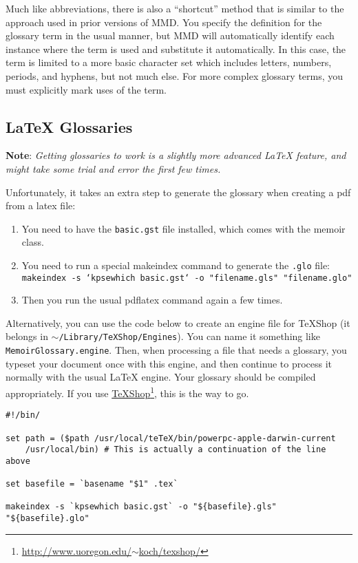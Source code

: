 Much like abbreviations, there is also a ``shortcut'' method that is similar to the approach used in prior versions of \gls{MMD}. You specify the definition for the glossary term in the usual manner, but \gls{MMD} will automatically identify each instance where the term is used and substitute it automatically. In this case, the term is limited to a more basic character set which includes letters, numbers, periods, and hyphens, but not much else. For more complex glossary terms, you must explicitly mark uses of the term.

\subsection{LaTeX Glossaries }
\label{latexglossaries}

\textbf{Note}: \emph{Getting glossaries to work is a slightly more advanced LaTeX
feature, and might take some trial and error the first few times.}

Unfortunately, it takes an extra step to generate the glossary when creating a
pdf from a latex file:

\begin{enumerate}
\item You need to have the \texttt{basic.gst} file installed, which comes with the
memoir class.

\item You need to run a special makeindex command to generate the \texttt{.glo} file:
\texttt{makeindex -s `kpsewhich basic.gst` -o "filename.gls" "filename.glo"}

\item Then you run the usual pdflatex command again a few times.

\end{enumerate}

Alternatively, you can use the code below to create an engine file for TeXShop (it belongs in \texttt{\ensuremath{\sim}\slash Library\slash TeXShop\slash Engines}). You can name it something like \texttt{MemoirGlossary.engine}. Then, when processing a file that needs a glossary, you typeset your document once with this engine, and then continue to process it normally with the usual LaTeX engine. Your glossary should be compiled appropriately. If you use \href{http://www.uoregon.edu/~koch/texshop/}{TeXShop}\footnote{\href{http://www.uoregon.edu/~koch/texshop/}{http:\slash \slash www.uoregon.edu\slash \ensuremath{\sim}koch\slash texshop\slash }}, this is the way to go.

\begin{verbatim}
#!/bin/	

set path = ($path /usr/local/teTeX/bin/powerpc-apple-darwin-current 
	/usr/local/bin) # This is actually a continuation of the line above

set basefile = `basename "$1" .tex`

makeindex -s `kpsewhich basic.gst` -o "${basefile}.gls" "${basefile}.glo"
\end{verbatim}

